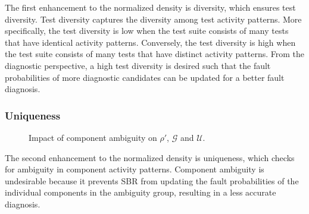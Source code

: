 \documentclass[twoside,a4paper,11pt]{memoir}
\begin{document}
The first enhancement to the normalized density is diversity, which ensures test diversity.
Test diversity captures the diversity among test activity patterns.
More specifically, the test diversity is low when the test suite consists of many tests that have identical activity patterns.
Conversely, the test diversity is high when the test suite consists of many tests that have distinct activity patterns.
From the diagnostic perspective, a high test diversity is desired such that the fault probabilities of more diagnostic candidates can be updated for a better fault diagnosis.

\subsubsection{Uniqueness}
\begin{figure}[htb]
\begin{center}
\qquad%
\end{center}
\vspace{-0.3cm}
\caption{Impact of component ambiguity on $\rho'$, $\mathcal{G}$ and
$\mathcal{U}$.}\label{fig:ambiguity_spectra}
\end{figure}
The second enhancement to the normalized density is uniqueness, which checks for ambiguity in component activity patterns.
Component ambiguity is undesirable because it prevents SBR from updating the fault probabilities of the individual components in the ambiguity group, resulting in a less accurate diagnosis.
\end{document}
